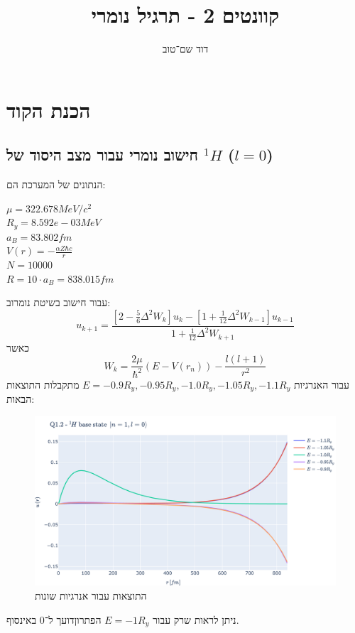 \documentclass{article}
\title{קוונטים 2 - תרגיל נומרי}
\author{דוד שם־טוב}
\begin{document}
\maketitle

\section{הכנת הקוד}
\subsection{חישוב נומרי עבור מצב היסוד של ${}^{1}\!H$ ($l=0$)}
הנתונים של המערכת הם:
\begin{multicols}{3}
    $\mu = 322.678 MeV / c^2$ \\
    $R_y = 8.592e-03 MeV$ \\
    $a_B = 83.802 fm$ \\
    $V(r) = -\frac{\alpha Z \hbar c}{r}$ \\
    $N = 10000$ \\
    $R = 10\cdot a_B = 838.015 fm$
\end{multicols}
עבור חישוב בשיטת נומרוב:
$$u_{k+1} = \frac{\left[2-\frac{5}{6}\Delta^2W_k\right]u_k-\left[1+\frac{1}{12}\Delta^2W_{k-1}\right]u_{k-1}}{1+\frac{1}{12}\Delta^2W_{k+1}}$$
כאשר 
$$W_k = \frac{2\mu}{\hbar^2}\left(E-V\left(r_n\right)\right) - \frac{l(l+1)}{r^2}$$
עבור האנרגיות $ E = -0.9 R_y, -0.95 R_y, -1.0 R_y, -1.05 R_y, -1.1 R_y$ מתקבלות התוצאות הבאות:

\begin{figure}[h]\label{fig:1.2}
    \centering
    \includegraphics[width=\linewidth]{plots/1.2.pdf}
    \caption{התוצאות עבור אנרגיות שונות}
\end{figure}
ניתן לראות שרק עבור $E = -1 R_y$ הפתרוןדועך ל־0 באינסוף.
\end{document}
